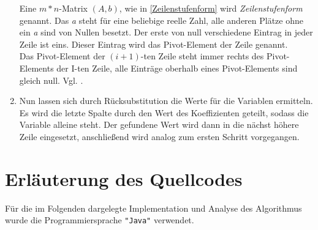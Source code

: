 \documentclass[a4paper, 12pt]{report}
\begin{document}
\begin{enumerate}
        Eine $ m * n $-Matrix $(A,b)$, wie in \ref{Zeilenstufenform} wird  \textit{Zeilenstufenform} genannt.
        Das \textit{a} steht für eine beliebige reelle Zahl, alle anderen Plätze ohne ein \textit{a} sind von Nullen besetzt.
        Der erste von null verschiedene Eintrag in jeder Zeile ist eins. Dieser Eintrag wird das Pivot-Element der Zeile genannt. \\
        Das Pivot-Element der $(i + 1)$-ten Zeile steht immer rechts des Pivot-Elements der I-ten Zeile, alle Einträge
        oberhalb eines Pivot-Elements sind gleich null. Vgl. \cite{5}.
    \item Nun lassen sich durch Rücksubstitution die Werte für die Variablen ermitteln.
        Es wird die letzte Spalte durch den Wert des Koeffizienten geteilt, sodass die Variable alleine steht.
        Der gefundene Wert wird dann in die nächst höhere Zeile eingesetzt, anschließend wird analog zum ersten Schritt vorgegangen.
\end{enumerate}

{\let\clearpage\relax \chapter{Erläuterung des Quellcodes}}
Für die im Folgenden dargelegte Implementation und Analyse des Algorithmus wurde die Programmiersprache \texttt{"Java"} verwendet.
\end{document}
